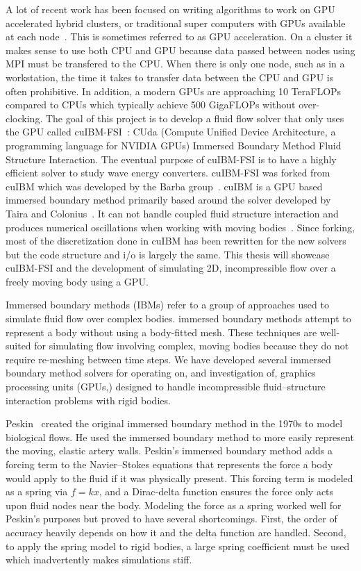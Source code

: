 A lot of recent work has been focused on writing algorithms to work on GPU accelerated hybrid clusters, or traditional super computers with GPUs available at each node~\cite{xu2014collaborating,liu2016hybrid,norouzi2016new}. 
This is sometimes referred to as GPU acceleration. 
On a cluster it makes sense to use both CPU and GPU because data passed between nodes using MPI must be transfered to the CPU. 
When there is only one node, such as in a workstation, the time it takes to transfer data between the CPU and GPU is often prohibitive. 
In addition, a modern GPUs are approaching 10 TeraFLOPs compared to CPUs which typically achieve 500 GigaFLOPs without over-clocking.
The goal of this project is to develop a fluid flow solver that only uses the GPU called cuIBM-FSI~\cite{cuIBM-v0.1}: CUda (Compute Unified Device Architecture, a programming language for NVIDIA GPUs) Immersed Boundary Method Fluid Structure Interaction. 
The eventual purpose of cuIBM-FSI is to have a highly efficient solver to study wave energy converters. 
cuIBM-FSI was forked from cuIBM which was developed by the Barba group~\cite{layton2011cuibm}. 
cuIBM is a GPU based immersed boundary method primarily based around the solver developed by Taira and Colonius~\cite{Taira:2007jl}. 
It can not handle coupled fluid structure interaction and produces numerical oscillations when working with moving bodies~\cite{Krishnan:2012jt}. 
Since forking, most of the discretization done in cuIBM has been rewritten for the new solvers but the code structure and i/o is largely the same. 
This thesis will showcase cuIBM-FSI and the development of simulating 2D, incompressible flow over a freely moving body using a GPU. 

Immersed boundary methods (IBMs) refer to a group of approaches used to simulate fluid flow over complex bodies. 
immersed boundary methods attempt to represent a body without using a body-fitted mesh. 
These techniques are well-suited for simulating flow involving complex, moving bodies because they do not require re-meshing between time steps. 
We have developed several immersed boundary method solvers for operating on, and investigation of, graphics processing units (GPUs,) designed to handle incompressible fluid--structure interaction problems with rigid bodies. 

Peskin~\cite{Peskin:1972gh} created the original immersed boundary method in the 1970s to model biological flows. 
He used the immersed boundary method to more easily represent the moving, elastic artery walls. 
Peskin's immersed boundary method adds a forcing term to the Navier--Stokes equations that represents the force a body would apply to the fluid if it was physically present. 
This forcing term is modeled as a spring via $f=kx$, and a Dirac-delta function ensures the force only acts upon fluid nodes near the body. 
Modeling the force as a spring worked well for Peskin's purposes but proved to have several shortcomings. 
First, the order of accuracy heavily depends on how it and the delta function are handled. 
Second, to apply the spring model to rigid bodies, a large spring coefficient must be used which inadvertently makes simulations stiff. 

